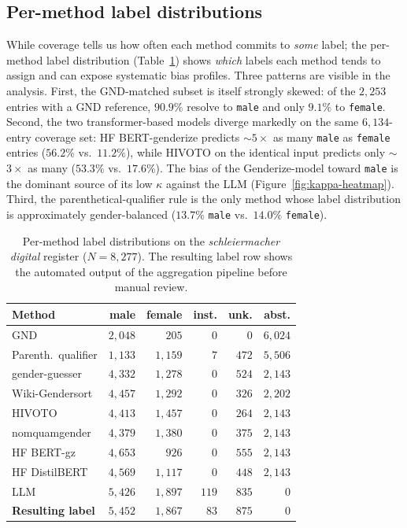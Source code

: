 \documentclass{eceasst}
\begin{document}
\subsection{Per-method label distributions}

While coverage tells us how often each method commits to \emph{some} label; the per-method label distribution (Table~\ref{tab:method-distribution}) shows \emph{which} labels each method tends to assign and can expose systematic bias profiles. Three patterns are visible in the analysis. First, the GND-matched subset is itself strongly skewed: of the $2{,}253$ entries with a GND reference, $90.9\%$ resolve to \texttt{male} and only $9.1\%$ to \texttt{female}. Second, the two transformer-based models diverge markedly on the same $6{,}134$-entry coverage set: HF BERT-genderize predicts $\sim$$5\times$ as many \texttt{male} as \texttt{female} entries ($56.2\%$ vs.\ $11.2\%$), while HIVOTO on the identical input predicts only $\sim$$3\times$ as many ($53.3\%$ vs.\ $17.6\%$). The bias of the Genderize-model toward \texttt{male} is the dominant source of its low $\kappa$ against the LLM (Figure~\ref{fig:kappa-heatmap}). Third, the parenthetical-qualifier rule is the only method whose label distribution is approximately gender-balanced ($13.7\%$ \texttt{male} vs.\ $14.0\%$ \texttt{female}).

\begin{table}
  \centering
  \scriptsize
  \setlength{\tabcolsep}{3pt}

  \begin{tabular}{lrrrrr}
      \toprule
    Method & male & female & inst. & unk. & abst. \\
    \midrule
    GND                  & $2{,}048$ & $205$   & $0$   & $0$   & $6{,}024$ \\
    Parenth.\ qualifier  & $1{,}133$ & $1{,}159$ & $7$   & $472$   & $5{,}506$ \\
    gender-guesser       & $4{,}332$ & $1{,}278$ & $0$   & $524$   & $2{,}143$ \\
    Wiki-Gendersort      & $4{,}457$ & $1{,}292$ & $0$   & $326$   & $2{,}202$ \\
    HIVOTO               & $4{,}413$ & $1{,}457$ & $0$   & $264$   & $2{,}143$ \\
    nomquamgender        & $4{,}379$ & $1{,}380$ & $0$   & $375$   & $2{,}143$ \\
    HF BERT-gz           & $4{,}653$ & $926$     & $0$   & $555$   & $2{,}143$ \\
    HF DistilBERT        & $4{,}569$ & $1{,}117$ & $0$   & $448$   & $2{,}143$ \\
    LLM                  & $5{,}426$ & $1{,}897$ & $119$ & $835$   & $0$        \\
    \midrule
    \textbf{Resulting label}    & $5{,}452$ & $1{,}867$ & $83$  & $875$   & $0$        \\
    \bottomrule
  \end{tabular}
  \caption{Per-method label distributions on the \textit{schleiermacher digital} register ($N = 8{,}277$). The resulting label row shows the automated output of the aggregation pipeline before manual review.}
  \label{tab:method-distribution}
\end{table}
\end{document}
